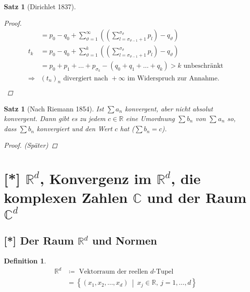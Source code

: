 \documentclass[11pt, twoside, a4paper]{article}
\theoremstyle{plain}
\newtheorem{definition}[blockelement]{Definition}
\newtheorem{satz}[blockelement]{Satz}
\newcommand{\set}[1]{\left\{#1\right\}}
\newcommand{\pair}[1]{\left(#1\right)}
\newcommand{\impl}[0]{\Rightarrow{}}
\newcommand{\definedas}[0]{\coloneqq}
\newcommand{\R}{\mathbb{R}}
\newcommand{\C}{\mathbb{C}}
\begin{document}
\begin{satz}[Dirichlet 1837]
\begin{proof}
            \begin{align*}
                &= p_0 - q_0 + \sum_{\vartheta = 1}^{\infty}\pair{ \pair{\sum_{l=\sigma_{\vartheta - 1} + 1}^{\sigma_{\vartheta}} p_l} - q_{\vartheta}}\\
                t_{k} &= p_0 - q_0 + \sum_{\vartheta = 1}^{k}\pair{ \pair{\sum_{l=\sigma_{\vartheta - 1} + 1}^{\sigma_{\vartheta}} p_l} - q_{\vartheta}}\tag{Partialsummen der Umordnung}\\
                &= p_0 + p_1 + \dots + p_{\sigma_k} - \pair{q_0 + q_1 + \dots + q_k} > k \text{ unbeschränkt}\\
                \impl &\pair{t_n}_n \text{ divergiert nach } +\infty \text { im Widerspruch zur Annahme.}\\
            \end{align*}
        \end{proof}
    \end{satz}


    \begin{satz}[Nach Riemann 1854]
        \marginnote{[14. Dez]}
        Ist $\sum a_n$ konvergent, aber nicht absolut konvergent. Dann gibt es zu jedem $c\in\R$ eine Umordnung $\sum_{}^{} b_n$ von $\sum_{}^{} a_n$ so, dass $\sum b_n$ konvergiert und den Wert $c$ hat ($\sum b_n = c$).

        \begin{proof}
        (Später)
        \end{proof}
    \end{satz}

    \newpage


    \section{[*] $\R^d$, Konvergenz im $\R^d$, die komplexen Zahlen $\C$ und der Raum $\C^d$}

    \subsection{[*] Der Raum $\R^d$ und Normen}

    \thispagestyle{pagenumberonly}

    \begin{definition}
        \begin{align*}
            \R^d &\definedas\text{ Vektorraum der reellen $d$-Tupel}\\
            &=\set{\pair{x_1, x_2, \dots, x_d} ~\middle|~ x_j\in\R,~ j=1,\dots,d }\\
        \end{align*}
    \end{definition}
\end{document}
